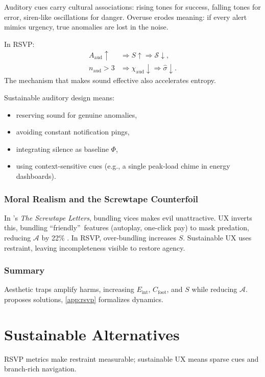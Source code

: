 \documentclass[openany]{book}
\newcommand{\PhiS}{\Phi} %
\newcommand{\Sent}{S} %
\newcommand{\Eint}{E_{\mathrm{int}}} %
\newcommand{\Cfoot}{C_{\mathrm{foot}}} %
\newcommand{\Auton}{\mathcal{A}} %
\begin{document}
Auditory cues carry cultural associations: rising tones for success, falling tones for error, siren-like oscillations for danger. Overuse erodes meaning: if every alert mimics urgency, true anomalies are lost in the noise.

In RSVP:
\begin{align}
A_{\mathrm{aud}} \uparrow &\Rightarrow \Sent \uparrow \Rightarrow \mathcal{S} \downarrow, \\
n_{\mathrm{aud}} > 3 &\Rightarrow \chi_{\mathrm{aud}} \downarrow \Rightarrow \widehat{\sigma} \downarrow.
\end{align}
The mechanism that makes sound effective also accelerates entropy.  

Sustainable auditory design means:
\begin{itemize}
  \item reserving sound for genuine anomalies,
  \item avoiding constant notification pings,
  \item integrating silence as baseline \(\PhiS\),
  \item using context-sensitive cues (e.g., a single peak-load chime in energy dashboards).
\end{itemize}

\section{Moral Realism and the Screwtape Counterfoil}
\label{sec:screwtape}
In \citet{lewis1942}’s \emph{The Screwtape Letters}, bundling vices makes evil unattractive. UX inverts this, bundling \textquotedblleft friendly\textquotedblright\ features (autoplay, one-click pay) to mask predation, reducing \(\Auton\) by 22\% \citep{doctorow2022}. In RSVP, over-bundling increases \(\Sent\). Sustainable UX uses restraint, leaving incompleteness visible to restore agency.

\section{Summary}
Aesthetic traps amplify harms, increasing \(\Eint\), \(\Cfoot\), and \(\Sent\) while reducing \(\Auton\).  proposes solutions, \cref{app:rsvp} formalizes dynamics.

\part{Sustainable Alternatives}
RSVP metrics make restraint measurable; sustainable UX means sparse cues and branch-rich navigation.
\end{document}
